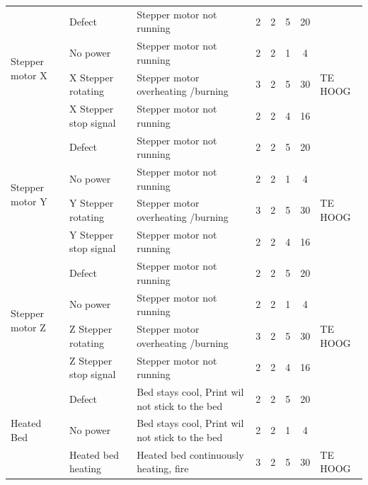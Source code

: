 \documentclass{article}
\begin{document}
\begin{landscape}
\begin{longtable}{|l|l|l|c|c|c|c|l|}
        \multirow{4}{*}{Stepper motor X}    & Defect                & Stepper motor not running             & 2 & 2 & 5 & 20 & \\
                                            & No power              & Stepper motor not running             & 2 & 2 & 1 &  4 & \\
                                            & X Stepper rotating    & Stepper motor overheating /burning    & 3 & 2 & 5 & 30 & TE HOOG \\
                                            & X Stepper stop signal & Stepper motor not running             & 2 & 2 & 4 & 16 & \\ 
                                            \hline 
        \multirow{4}{*}{Stepper motor Y}    & Defect                & Stepper motor not running             & 2 & 2 & 5 & 20 & \\
                                            & No power              & Stepper motor not running             & 2 & 2 & 1 &  4 & \\
                                            & Y Stepper rotating    & Stepper motor overheating /burning    & 3 & 2 & 5 & 30 & TE HOOG \\
                                            & Y Stepper stop signal & Stepper motor not running             & 2 & 2 & 4 & 16 & \\ 
                                            \hline
        \multirow{4}{*}{Stepper motor Z}    & Defect                & Stepper motor not running             & 2 & 2 & 5 & 20 & \\
                                            & No power              & Stepper motor not running             & 2 & 2 & 1 &  4 & \\
                                            & Z Stepper rotating    & Stepper motor overheating /burning    & 3 & 2 & 5 & 30 & TE HOOG \\
                                            & Z Stepper stop signal & Stepper motor not running             & 2 & 2 & 4 & 16 & \\ 
                                            \hline 
        \multirow{4}{*}{Heated Bed}         & Defect                    & Bed stays cool, Print wil not stick to the bed    & 2 & 2 & 5 & 20 & \\
                                            & No power                  & Bed stays cool, Print wil not stick to the bed    & 2 & 2 & 1 &  4 & \\
                                            & Heated bed heating        & Heated bed continuously heating, fire             & 3 & 2 & 5 & 30 & TE HOOG \\

\end{longtable}
\end{landscape}
\end{document}
